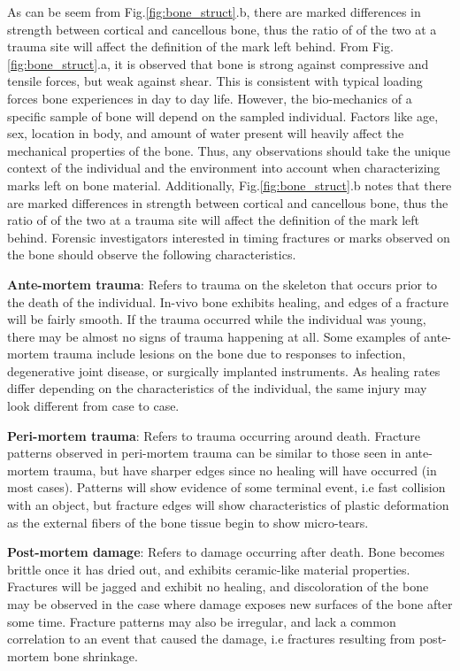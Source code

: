 \documentclass[titlepage]{article}
\begin{document}
As can be seem from Fig.\ref{fig:bone_struct}.b, there are marked differences in strength between cortical and cancellous bone, thus the ratio of of the two at a trauma site will affect the definition of the mark left behind.  From Fig.\ref{fig:bone_struct}.a, it is observed that bone is strong against compressive and tensile forces, but weak against shear. This is consistent with typical loading forces bone experiences in day to day life. However, the bio-mechanics of a specific sample of bone will depend on the sampled individual. Factors like age, sex, location in body, and amount of water present will heavily affect the mechanical properties of the bone. Thus, any observations should take the unique context of the individual and the environment into account when characterizing marks left on bone material. Additionally, Fig.\ref{fig:bone_struct}.b notes that there are marked differences in strength between cortical and cancellous bone, thus the ratio of of the two at a trauma site will affect the definition of the mark left behind. Forensic investigators interested in timing fractures or marks observed on the bone should observe the following characteristics.

\textbf{Ante-mortem trauma}: Refers to trauma on the skeleton that occurs prior to the death of the individual. In-vivo bone exhibits healing, and edges of a fracture will be fairly smooth. If the trauma occurred while the individual was young, there may be almost no signs of trauma happening at all. Some examples of ante-mortem trauma include lesions on the bone due to responses to infection, degenerative joint disease, or surgically implanted instruments. As healing rates differ depending on the characteristics of the individual, the same injury may look different from case to case.

\textbf{Peri-mortem trauma}: Refers to trauma occurring around death. Fracture patterns observed in peri-mortem trauma can be similar to those seen in ante-mortem trauma, but have sharper edges since no healing will have occurred (in most cases). Patterns will show evidence of some terminal event, i.e fast collision with an object, but fracture edges will show characteristics of plastic deformation as the external fibers of the bone tissue begin to show micro-tears.

\textbf{Post-mortem damage}: Refers to damage occurring after death. Bone becomes brittle once it has dried out, and exhibits ceramic-like material properties. Fractures will be jagged and exhibit no healing, and discoloration of the bone may be observed in the case where damage exposes new surfaces of the bone after some time. Fracture patterns may also be irregular, and lack a common correlation to an event that caused the damage, i.e fractures resulting from post-mortem bone shrinkage.\cite{trauma, evid}
\end{document}
